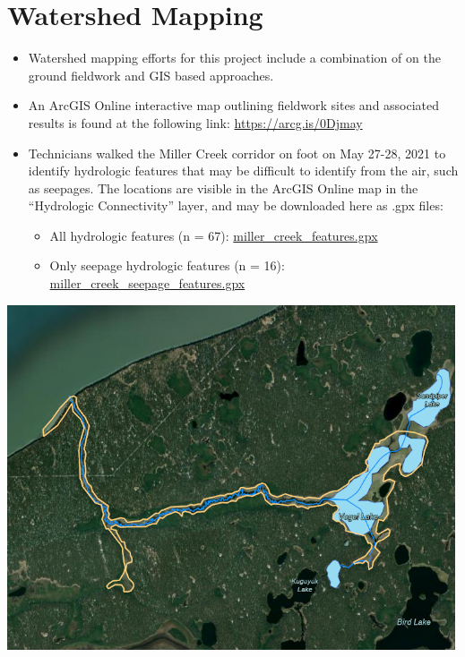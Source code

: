 \documentclass[
]{book}
\begin{document}
\hypertarget{watershed-mapping}{%
\chapter{Watershed Mapping}\label{watershed-mapping}}

\begin{itemize}
\item
  Watershed mapping efforts for this project include a combination of on the ground fieldwork and GIS based approaches.
\item
  An ArcGIS Online interactive map outlining fieldwork sites and associated results is found at the following link: \url{https://arcg.is/0Djmay}
\item
  Technicians walked the Miller Creek corridor on foot on May 27-28, 2021 to identify hydrologic features that may be difficult to identify from the air, such as seepages. The locations are visible in the ArcGIS Online map in the ``Hydrologic Connectivity'' layer, and may be downloaded here as .gpx files:

  \begin{itemize}
  \item
    All hydrologic features (n = 67): \href{https://drive.google.com/file/d/1PQu1v6nTD6MB3YStwBF3mgV0wydKziIa/view?usp=sharing}{miller\_creek\_features.gpx}
  \item
    Only seepage hydrologic features (n = 16): \href{https://drive.google.com/file/d/1_c4FQDR0t2sW_yphFuuiSpRmydPzjR3i/view?usp=sharing}{miller\_creek\_seepage\_features.gpx}
  \end{itemize}
\end{itemize}

\href{https://arcg.is/1GeLTX}{\includegraphics[width=5.20833in,height=\textheight]{images/miller_map.png}}
\end{document}

